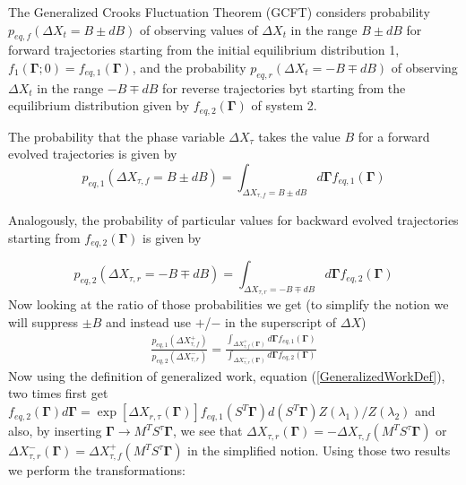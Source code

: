 \documentclass[a4paper,12pt]{article}
\begin{document}
The Generalized Crooks Fluctuation Theorem (GCFT) considers probability $p_{eq,f}(\Delta X_t = B \pm dB)$ of observing values of $\Delta X_t$ in the range $B\pm dB$ for forward trajectories starting from the initial equilibrium distribution 1, $f_1(\bm{\Gamma};0)=f_{eq,1}(\bm{\Gamma})$, and the probability $p_{eq,r}(\Delta X_t = -B \mp dB)$ of observing $\Delta X_t$ in the range $ -B\mp dB$ for reverse trajectories byt starting from the equilibrium distribution given by $f_{eq,2}(\bm{\Gamma})$ of system 2.

The probability that the phase variable $\Delta X_{\tau}$ takes the value $B$ for a forward evolved trajectories is given by
\begin{equation}
  p_{eq,1}(\Delta X_{\tau,f}=B\pm dB) = \int_{\Delta X_{\tau,f}=B\pm dB} d\bm{\Gamma} f_{eq,1}(\bm{\Gamma})
\end{equation}

Analogously, the probability of particular values for backward evolved trajectories starting from $f_{eq,2}(\bm{\Gamma})$ is given by

\begin{equation}
  p_{eq,2}(\Delta X_{\tau,r}=-B\mp dB) = \int_{\Delta X_{\tau,r}=-B\mp dB} d\bm{\Gamma} f_{eq,2}(\bm{\Gamma})
\end{equation}
Now looking at the ratio of those probabilities we get (to simplify the notion we will suppress $\pm B$ and instead use $+$/$-$ in the superscript of $\Delta X$)
\begin{equation}
\begin{aligned}
  \frac{p_{eq,1}(\Delta X_{\tau,f}^+)}{p_{eq,2}(\Delta X_{\tau,r}^-)}
= \frac{\int_{\Delta X_{\tau,f}^+(\bm{\Gamma})} d\bm{\Gamma} f_{eq,1}(\bm{\Gamma})}{\int_{\Delta X_{\tau,r}^-(\bm{\Gamma})} d\bm{\Gamma} f_{eq,2}(\bm{\Gamma})}
\end{aligned}
\end{equation}
Now using the definition of generalized work, equation (\ref{GeneralizedWorkDef}), two times first get $f_{eq,2}(\bm{\Gamma})d\bm{\Gamma}= \exp[\Delta X_{r,\tau}(\bm{\Gamma})] f_{eq,1}(S^T \bm{\Gamma}) d(S^T \bm{\Gamma}) Z(\lambda_1)/Z(\lambda_2) $ and also, by inserting $\bm{\Gamma} \to M^T S^{\tau} \bm{\Gamma}$, we see that $\Delta X_{\tau,r}(\bm{\Gamma}) = -\Delta X_{\tau,f}(M^T S^{\tau} \bm{\Gamma}) $ or $\Delta X_{\tau,r}^-(\bm{\Gamma}) = \Delta X_{\tau,f}^+(M^T S^{\tau} \bm{\Gamma}) $ in the simplified notion. Using those two results we perform the transformations:
\end{document}

